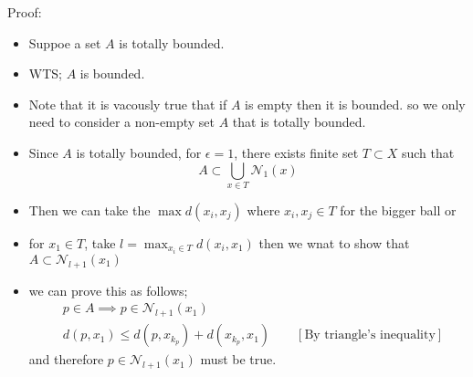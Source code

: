 \documentclass[12pt,a4paper]{article}
\begin{document}
Proof:
\begin{itemize}
    \item Suppoe a set \(A\)  is totally bounded.
    \item WTS; \(A\) is bounded.
    \item Note that it is vacously true that if \(A\) is empty then it is bounded. so we only need to consider a non-empty set \(A\) that is totally bounded.
    \item Since \(A\) is totally bounded, for \(\epsilon=1\), there exists finite set \(T \subset X\) such that \[A \subset \bigcup_{x\in T}\mathcal{N}_{1}(x)\] 
    \item Then we can take the \(\max d(x_{i},x_{j})\) where \(x_{i},x_{j} \in T\) for the bigger ball or
    \item for \(x_{1} \in T\), take \(l=\max_{x_{i}\in T} d(x_{i}, x_{1})\) then we wnat to show that \(A \subset \mathcal{N}_{l+1}(x_{1})\) 
    \item we can prove this as follows;
    \begin{align*}
        &p \in A \implies p \in \mathcal{N}_{l+1}(x_{1})\\
        &d(p,x_{1}) \leq d(p,x_{k_{p}}) + d (x_{k_{p}}, x_{1}) \qquad [\text{By triangle's inequality}]
    \end{align*}
     and therefore \( p \in \mathcal{N}_{l+1}(x_{1})\) must be true.  
\end{itemize}
\end{document}

